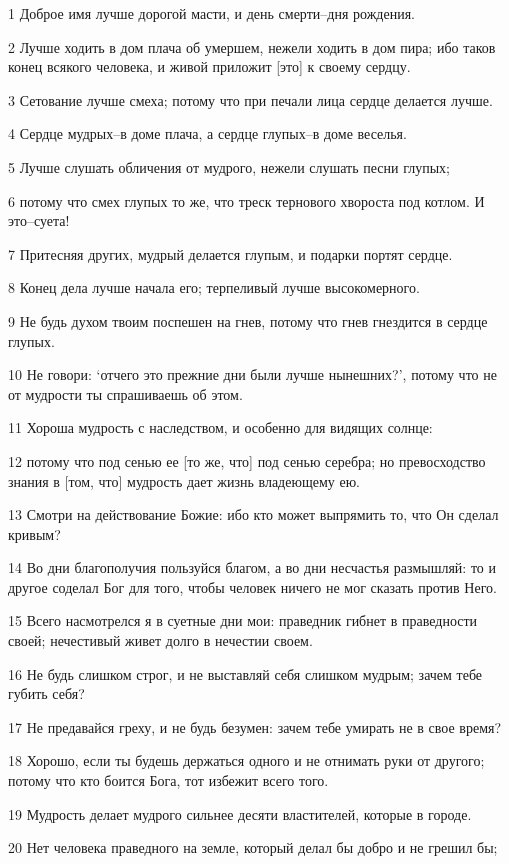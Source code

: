 \par 1 Доброе имя лучше дорогой масти, и день смерти--дня рождения.
\par 2 Лучше ходить в дом плача об умершем, нежели ходить в дом пира; ибо таков конец всякого человека, и живой приложит [это] к своему сердцу.
\par 3 Сетование лучше смеха; потому что при печали лица сердце делается лучше.
\par 4 Сердце мудрых--в доме плача, а сердце глупых--в доме веселья.
\par 5 Лучше слушать обличения от мудрого, нежели слушать песни глупых;
\par 6 потому что смех глупых то же, что треск тернового хвороста под котлом. И это--суета!
\par 7 Притесняя других, мудрый делается глупым, и подарки портят сердце.
\par 8 Конец дела лучше начала его; терпеливый лучше высокомерного.
\par 9 Не будь духом твоим поспешен на гнев, потому что гнев гнездится в сердце глупых.
\par 10 Не говори: `отчего это прежние дни были лучше нынешних?', потому что не от мудрости ты спрашиваешь об этом.
\par 11 Хороша мудрость с наследством, и особенно для видящих солнце:
\par 12 потому что под сенью ее [то же, что] под сенью серебра; но превосходство знания в [том, что] мудрость дает жизнь владеющему ею.
\par 13 Смотри на действование Божие: ибо кто может выпрямить то, что Он сделал кривым?
\par 14 Во дни благополучия пользуйся благом, а во дни несчастья размышляй: то и другое соделал Бог для того, чтобы человек ничего не мог сказать против Него.
\par 15 Всего насмотрелся я в суетные дни мои: праведник гибнет в праведности своей; нечестивый живет долго в нечестии своем.
\par 16 Не будь слишком строг, и не выставляй себя слишком мудрым; зачем тебе губить себя?
\par 17 Не предавайся греху, и не будь безумен: зачем тебе умирать не в свое время?
\par 18 Хорошо, если ты будешь держаться одного и не отнимать руки от другого; потому что кто боится Бога, тот избежит всего того.
\par 19 Мудрость делает мудрого сильнее десяти властителей, которые в городе.
\par 20 Нет человека праведного на земле, который делал бы добро и не грешил бы;
